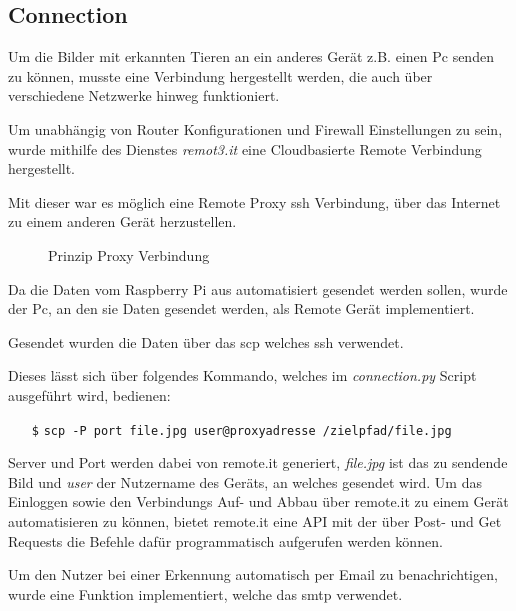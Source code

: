 \subsection*{Connection}

Um die Bilder mit erkannten Tieren an ein anderes Gerät 
z.B. einen Pc senden zu können, musste eine Verbindung
hergestellt werden, die auch über verschiedene Netzwerke 
hinweg funktioniert.

Um unabhängig von Router Konfigurationen und Firewall 
Einstellungen zu sein, wurde mithilfe des
Dienstes \textit{remot3.it} \cite{remoteit}
eine Cloudbasierte Remote Verbindung hergestellt.

Mit dieser war es möglich eine Remote Proxy \Gls{ssh}
Verbindung, über das Internet zu einem anderen Gerät 
herzustellen.

\begin{figure}[H]
    \centering
    \def\svgwidth{0.7\textwidth}
    
    \caption{Prinzip Proxy Verbindung}
    \label{fig:remoteit}
\end{figure}

Da die Daten vom Raspberry Pi aus automatisiert gesendet 
werden sollen, wurde der Pc, an den 
sie Daten gesendet werden, als Remote Gerät implementiert.

Gesendet wurden die Daten über das \Gls{scp}
welches \Gls{ssh} verwendet.

Dieses lässt sich über folgendes Kommando,
welches im \textit{connection.py}
Script ausgeführt wird, bedienen:
\begin{itemize}
    \item[\texttt{\$}] \texttt{scp -P port file.jpg 
    user@proxyadresse /zielpfad/file.jpg}
\end{itemize}

Server und Port werden dabei von remote.it
generiert, \textit{file.jpg} ist das zu sendende Bild und
\textit{user} der Nutzername des Geräts,
an welches gesendet wird.
Um das Einloggen sowie den Verbindungs Auf- und Abbau 
über remote.it zu einem Gerät automatisieren zu können,
bietet remote.it eine API mit der über Post- und Get Requests
die Befehle dafür programmatisch aufgerufen werden können.

Um den Nutzer bei einer Erkennung automatisch 
per Email zu benachrichtigen, wurde 
eine Funktion implementiert, welche das 
\Gls{smtp} verwendet.
